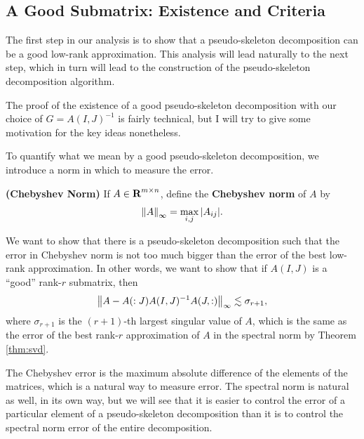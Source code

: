 \documentclass{article}
\begin{document}
	\subsection{A Good Submatrix: Existence and Criteria}
	
	The first step in our analysis is to show that a pseudo-skeleton decomposition can be a good low-rank approximation. This analysis will lead naturally to the next step, which in turn will lead to the construction of the pseudo-skeleton decomposition algorithm.
	
	The proof of the existence of a good pseudo-skeleton decomposition with our choice of $G = A(I,J)^{-1}$ is fairly technical, but I will try to give some motivation for the key ideas nonetheless. 
	
	
	To quantify what we mean by a good pseudo-skeleton decomposition, we introduce a norm in which to measure the error.
	
	\begin{dfn} \textnormal{\bf(Chebyshev Norm)}
		\label{def:chebyshev_norm}
		If $A \in \textnormal{\bf R}^{m\times n}$, define the \textbf{Chebyshev norm} of $A$ by
		\begin{equation}
			\label{eq:chebyshev_norm}
			\left\lVert A \right\rVert_\infty = \max_{i,j} |A_{ij}|.
		\end{equation}
	\end{dfn}
	
	We want to show that there is a pseudo-skeleton decomposition such that the error in Chebyshev norm is not too much bigger than the error of the best low-rank approximation. In other words, we want to show that if $A(I,J)$ is a ``good'' rank-$r$ submatrix, then
	\begin{equation}
		\label{eq:theory_goal}
		\left\lVert A - A(:J)A(I,J)^{-1}A(J,:) \right\rVert_\infty \lesssim \sigma_{r+1},
	\end{equation}
	where $\sigma_{r+1}$ is the $(r+1)$-th largest singular value of $A$, which is the same as the error of the best rank-$r$ approximation of $A$ in the spectral norm by Theorem \ref{thm:svd}.
	
	The Chebyshev error is the maximum absolute difference of the elements of the matrices, which is a natural way to measure error. The spectral norm is natural as well, in its own way, but we will see that it is easier to control the error of a particular element of a pseudo-skeleton decomposition than it is to control the spectral norm error of the entire decomposition.
	
\end{document}
